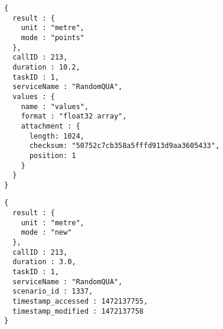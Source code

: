 \begin{lstlisting}[caption={A qua-compliant service output for mode \texttt{points}}, label={lst:quacompliantresult:points}]
{
  result : {
    unit : "metre",
    mode : "points"
  },
  callID : 213,
  duration : 10.2,
  taskID : 1,
  serviceName : "RandomQUA",
  values : {
    name : "values",
    format : "float32 array",
    attachment : {
      length: 1024,
      checksum: "50752c7cb358a5fffd913d9aa3605433",
      position: 1
    }
  }
}
\end{lstlisting}

\begin{lstlisting}[caption={A qua-compliant service output for mode \texttt{new}}, label={lst:quacompliantresult:new}]
{
  result : {
    unit : "metre",
    mode : "new"
  },
  callID : 213,
  duration : 3.0,
  taskID : 1,
  serviceName : "RandomQUA",
  scenario_id : 1337,
  timestamp_accessed : 1472137755,
  timestamp_modified : 1472137758
}
\end{lstlisting}

\clearpage
